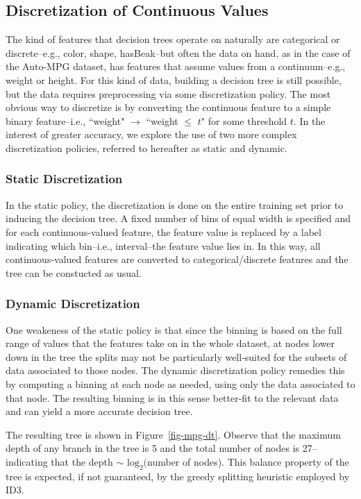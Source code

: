 \documentclass[12pt, conference, compsocconf]{IEEEtran}
\begin{document}
\subsection{Discretization of Continuous Values}
The kind of features that decision trees operate on naturally are categorical or discrete--e.g., color, shape, hasBeak--but often the data on hand, as in the case of the Auto-MPG dataset, has features that assume values from a continuum--e.g., weight or height.
For this kind of data, building a decision tree is still possible, but the data requires preprocessing via some discretization policy. 
The most obvious way to discretize is by converting the continuous feature to a simple binary feature--i.e., ``weight" $\rightarrow$ ``weight $\leq$ $t$" for some threshold $t$. 
In the interest of greater accuracy, we explore the use of two more complex discretization policies, referred to hereafter as static and dynamic.

\subsubsection{Static Discretization}
In the static policy, the discretization is done on the entire training set prior to inducing the decision tree. 
A fixed number of bins of equal width is specified and for each continuous-valued feature, the feature value is replaced by a label indicating which bin--i.e., interval--the feature value lies in. 
In this way, all continuous-valued features are converted to categorical/discrete features and the tree can be constucted as usual. 

\subsubsection{Dynamic Discretization}
One weakeness of the static policy is that since the binning is based on the full range of values that the features take on in the whole dataset, at nodes lower down in the tree the splits may not be particularly well-suited for the subsets of data associated to those nodes. 
The dynamic discretization policy remedies this by computing a binning at each node as needed, using only the data associated to that node. 
The resulting binning is in this sense better-fit to the relevant data and can yield a more accurate decision tree. 

The resulting tree is shown in Figure~\ref{fig-mpg-dt}. Observe that the maximum depth of any branch in the tree is 5 and the total number of nodes is 27--indicating that the depth $\sim$ $\text{log}_{2}($number of nodes). This balance property of the tree is expected, if not guaranteed, by the greedy splitting heuristic employed by ID3. 
\end{document}

